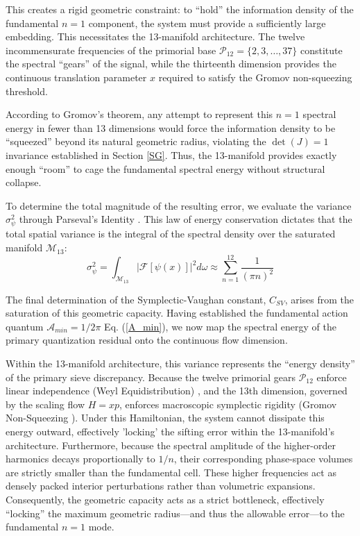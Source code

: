 \documentclass[sn-mathphys-num, pdflatex]{sn-jnl}
\begin{document}
This creates a rigid geometric constraint: to ``hold'' the information density of the fundamental $n=1$ component, the system must provide a sufficiently large embedding. This necessitates the 13-manifold architecture. The twelve incommensurate frequencies of the primorial base $\mathcal{P}_{12} = \{2, 3, \dots, 37\}$ constitute the spectral ``gears'' of the signal, while the thirteenth dimension provides the continuous translation parameter $x$ required to satisfy the Gromov non-squeezing threshold. 

According to Gromov's theorem, any attempt to represent this $n=1$ spectral energy in fewer than 13 dimensions would force the information density to be ``squeezed'' beyond its natural geometric radius, violating the $\det(J)=1$ invariance established in Section \ref{SG}. Thus, the 13-manifold provides exactly enough ``room'' to cage the fundamental spectral energy without structural collapse. 

 To determine the total magnitude of the resulting error, we evaluate the variance $\sigma_{\psi}^2$ through Parseval's Identity \cite{stein2003fourier}. This law of energy conservation dictates that the total spatial variance is the integral of the spectral density over the saturated manifold $\mathcal{M}_{13}$:
\begin{equation}
\sigma_{\psi}^2 = \int_{\mathcal{M}_{13}} \left| \mathcal{F}[\psi(x)] \right|^2 d\omega \approx \sum_{n=1}^{12} \frac{1}{(\pi n)^2} 
\end{equation}

The final determination of the Symplectic-Vaughan constant, $C_{SV}$, arises from the saturation of this geometric capacity. Having established the fundamental action quantum $\mathcal{A}_{min} = 1/2\pi$ Eq. (\ref{A_min}), we now map the spectral energy of the primary quantization residual onto the continuous flow dimension.

Within the 13-manifold architecture, this variance represents the ``energy density'' of the primary sieve discrepancy. Because the twelve primorial gears $\mathcal{P}_{12}$ enforce linear independence (Weyl Equidistribution) \cite{weyl}, and the 13th dimension, governed by the scaling flow $H=xp$, enforces macroscopic symplectic rigidity (Gromov Non-Squeezing \cite{gromov}). Under this Hamiltonian, the system cannot dissipate this energy outward, effectively 'locking' the sifting error within the 13-manifold's architecture. Furthermore, because the spectral amplitude of the higher-order harmonics decays proportionally to $1/n$, their corresponding phase-space volumes are strictly smaller than the fundamental cell. These higher frequencies act as densely packed interior perturbations rather than volumetric expansions. Consequently, the geometric capacity acts as a strict bottleneck, effectively ``locking'' the maximum geometric radius---and thus the allowable error---to the fundamental $n=1$ mode.
\end{document}
